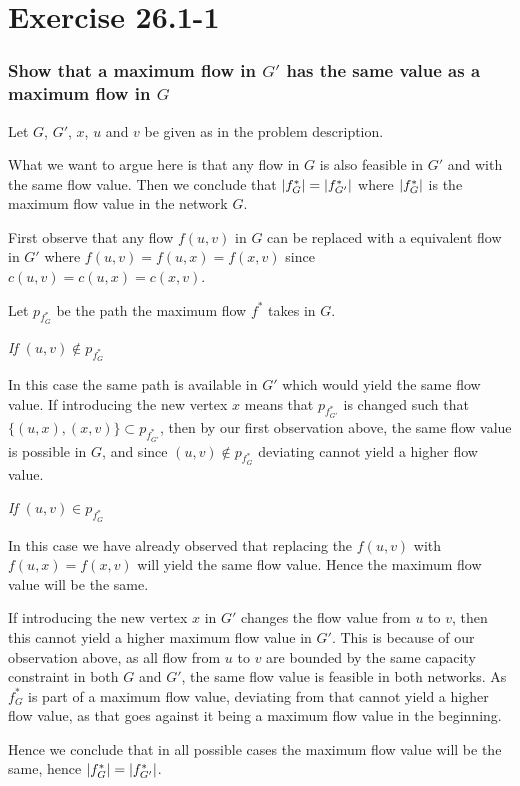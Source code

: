\section*{Exercise 26.1-1}
\subsubsection*{Show that a maximum flow in $G'$ has the same value as a maximum flow in $G$}
Let $G$, $G'$, $x$, $u$ and $v$ be given as in the problem description.

What we want to argue here is that any flow in $G$ is also feasible in $G'$ and with the same flow value. 
Then we conclude that $\lvert f_G^*\rvert = \lvert f_{G'}^*\rvert$ where $\lvert f_{G}^*\rvert$ is the maximum flow value in the network $G$.

First observe that any flow $f(u,v)$ in $G$ can be replaced with a equivalent flow in $G'$ where $f(u,v) = f(u,x) = f(x,v)$ since $c(u,v) = c(u,x) = c(x,v)$.

Let $p_{f_G^*}$ be the path the maximum flow $f^*$ takes in $G$.

\textit{If $(u,v) \not\in p_{f_G^*}$}

In this case the same path is available in $G'$ which would yield the same flow value. If introducing the new vertex $x$ means that $p_{f_{G'}^*}$ is changed such that $\{(u,x),(x,v)\}\subset p_{f_{G'}^*}$, then by our first observation above, the same flow value is possible in $G$, and since $(u,v) \not\in p_{f_G^*}$ deviating cannot yield a higher flow value.

\textit{If $(u,v) \in p_{f_G^*}$}

In this case we have already observed that replacing the $f(u,v)$ with $f(u,x) = f(x,v)$ will yield the same flow value. Hence the maximum flow value will be the same.

If introducing the new vertex $x$ in $G'$ changes the flow value from $u$ to $v$, then this cannot yield a higher maximum flow value in $G'$. This is because of our observation above, as all flow from $u$ to $v$ are bounded by the same capacity constraint in both $G$ and $G'$, the same flow value is feasible in both networks. As $f^*_G$ is part of a maximum flow value, deviating from that cannot yield a higher flow value, as that goes against it being a maximum flow value in the beginning.

Hence we conclude that in all possible cases the maximum flow value will be the same, hence $\lvert f_G^*\rvert = \lvert f_{G'}^*\rvert$.